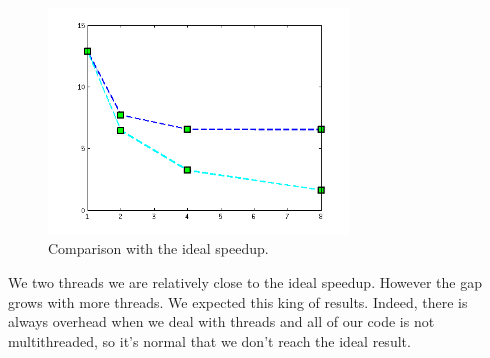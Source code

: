 \documentclass[a4paper,10pt]{article}
\begin{document}
\begin{figure}[!ht]
  \centering
  \includegraphics[width=8cm]{speedup.png}
  \caption{Comparison with the ideal speedup.}
\end{figure} 

We two threads we are relatively close to the ideal speedup. However the gap grows with more threads. We expected this king of results.
Indeed, there is always overhead when we deal with threads and all of our code is not multithreaded, so it's normal that we don't reach
the ideal result.
\end{document}

